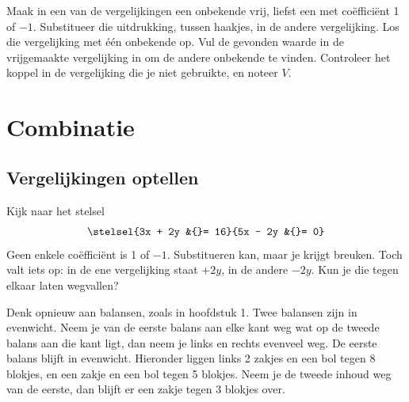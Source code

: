 \begin{werkwijze}
Maak in een van de vergelijkingen een onbekende vrij, liefst een met coëfficiënt 1 of $-1$. Substitueer die uitdrukking, tussen haakjes, in de andere vergelijking. Los die vergelijking met één onbekende op. Vul de gevonden waarde in de vrijgemaakte vergelijking in om de andere onbekende te vinden. Controleer het koppel in de vergelijking die je niet gebruikte, en noteer $V$.
\end{werkwijze}


\begin{oefeningen}
\end{oefeningen}

\section{Combinatie}

\subsection{Vergelijkingen optellen}

Kijk naar het stelsel
\[ \stelsel{3x + 2y &{}= 16}{5x - 2y &{}= 0} \]
Geen enkele coëfficiënt is 1 of $-1$. Substitueren kan, maar je krijgt breuken. Toch valt iets op: in de ene vergelijking staat $+2y$, in de andere $-2y$. Kun je die tegen elkaar laten wegvallen?

Denk opnieuw aan balansen, zoals in hoofdstuk 1. Twee balansen zijn in evenwicht. Neem je van de eerste balans aan elke kant weg wat op de tweede balans aan die kant ligt, dan neem je links en rechts evenveel weg. De eerste balans blijft in evenwicht. Hieronder liggen links 2 zakjes en een bol tegen 8 blokjes, en een zakje en een bol tegen 5 blokjes. Neem je de tweede inhoud weg van de eerste, dan blijft er een zakje tegen 3 blokjes over.


